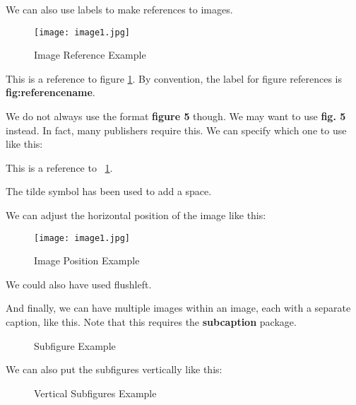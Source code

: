 \documentclass[a4paper, 12pt]{article}
\begin{document}
\newpage

We can also use labels to make references to images.

\begin{figure}[h]
    \centering
    \texttt{[image: image1.jpg]}
    \caption{Image Reference Example}
    \label{fig:imageref}
\end{figure}

This is a reference to figure \ref{fig:imageref}.
By convention, the label for figure references is \textbf{fig:referencename}.

We do not always use the format \textbf{figure 5} though. We may want to use \textbf{fig. 5} instead. In fact, many publishers require this. We can specify which one to use like this:

This is a reference to \figurename~\ref{fig:imageref}.

The tilde symbol has been used to add a space.

We can adjust the horizontal position of the image like this:

\begin{figure}[h]
    \flushright
    \texttt{[image: image1.jpg]}
    \caption{Image Position Example}
\end{figure}

We could also have used flushleft.

And finally, we can have multiple images within an image, each with a separate caption, like this. Note that this requires the \textbf{subcaption} package.

\begin{figure}
    \centering
    \caption{Subfigure Example}
\end{figure}

\newpage

We can also put the subfigures vertically like this:

\begin{figure}[h]
    \centering
    \hspace{1cm}
    \caption{Vertical Subfigures Example}
    
\end{figure}
\end{document}
